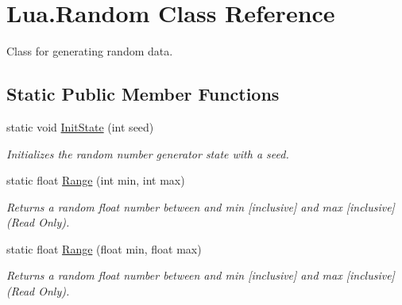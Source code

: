 \hypertarget{class_lua_1_1_random}{}\section{Lua.\+Random Class Reference}
\label{class_lua_1_1_random}


Class for generating random data.  


\subsection*{Static Public Member Functions}
\begin{DoxyCompactItemize}
\item 
static void \mbox{\hyperlink{class_lua_1_1_random_ac69b6f407406ae02a7595403097ec8a8}{Init\+State}} (int seed)
\begin{DoxyCompactList}\small\item\em Initializes the random number generator state with a seed. \end{DoxyCompactList}\item 
static float \mbox{\hyperlink{class_lua_1_1_random_ab17e85e47aeaa3f719b649e51bb49d28}{Range}} (int min, int max)
\begin{DoxyCompactList}\small\item\em Returns a random float number between and min \mbox{[}inclusive\mbox{]} and max \mbox{[}inclusive\mbox{]} (Read Only). \end{DoxyCompactList}\item 
static float \mbox{\hyperlink{class_lua_1_1_random_a5afbf9cff5e196e2fd7e5ab917b64a8b}{Range}} (float min, float max)
\begin{DoxyCompactList}\small\item\em Returns a random float number between and min \mbox{[}inclusive\mbox{]} and max \mbox{[}inclusive\mbox{]} (Read Only). \end{DoxyCompactList}\end{DoxyCompactItemize}
